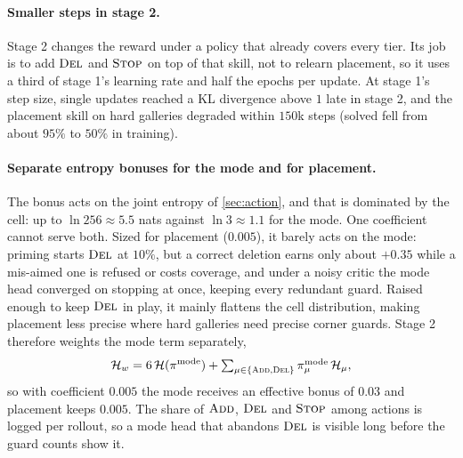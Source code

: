 \documentclass[11pt,a4paper]{article}
\begin{document}
\paragraph{Smaller steps in stage 2.}
Stage 2 changes the reward under a policy that already covers every tier. Its job is to
add $\textsc{Del}$ and $\textsc{Stop}$ on top of that skill, not to relearn placement, so it uses a third of
stage 1's learning rate and half the epochs per update. At stage 1's step size, single
updates reached a KL divergence above $1$ late in stage 2, and the placement skill on hard
galleries degraded within $150$k steps (solved fell from about $95\%$ to $50\%$ in training).

\paragraph{Separate entropy bonuses for the mode and for placement.}
The bonus acts on the joint entropy of \cref{sec:action}, and that is dominated by the
cell: up to $\ln 256 \approx 5.5$ nats against $\ln 3 \approx 1.1$ for the mode. One coefficient
cannot serve both. Sized for placement ($0.005$), it barely acts on the mode: priming
starts $\textsc{Del}$ at $10\%$, but a correct deletion earns only about $+0.35$ while a mis-aimed one
is refused or costs coverage, and under a noisy critic the mode head converged on stopping
at once, keeping every redundant guard. Raised enough to keep $\textsc{Del}$ in play, it mainly
flattens the cell distribution, making placement less precise where hard galleries need
precise corner guards. Stage 2 therefore weights the mode term separately,
\[
  \mathcal{H}_w = 6\,\mathcal{H}(\pi^{\mathrm{mode}}) + \textstyle\sum_{\mu\in\{\textsc{Add},\textsc{Del}\}} \pi^{\mathrm{mode}}_\mu\,\mathcal{H}_\mu,
\]
so with coefficient $0.005$ the mode receives an effective bonus of $0.03$ and placement
keeps $0.005$. The share of $\textsc{Add}$, $\textsc{Del}$ and $\textsc{Stop}$ among actions is logged per rollout,
so a mode head that abandons $\textsc{Del}$ is visible long before the guard counts show it.
\end{document}
